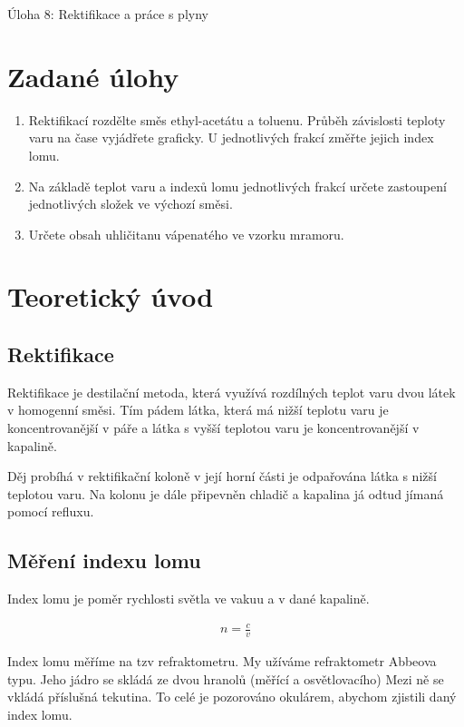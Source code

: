 \documentclass[13pt, a4paper, twoside]{article}
\begin{document}
\begin{center}
    \Huge
    Úloha 8: Rektifikace a práce s plyny
\end{center}
\large \onehalfspacing
\section*{Zadané úlohy}
\begin{enumerate}
    \item Rektifikací rozdělte směs ethyl-acetátu a toluenu. Průběh závislosti teploty varu na čase
    vyjádřete graficky. U jednotlivých frakcí změřte jejich index lomu.
    \item  Na základě teplot varu a indexů lomu jednotlivých frakcí určete zastoupení jednotlivých
    složek ve výchozí směsi.
    \item Určete obsah uhličitanu vápenatého ve vzorku mramoru.
\end{enumerate}

\section*{Teoretický úvod}
\subsection*{Rektifikace}
Rektifikace je destilační metoda, která využívá rozdílných teplot varu dvou látek v homogenní směsi. Tím pádem látka, která má nižší teplotu varu je koncentrovanější v páře a látka s vyšší teplotou varu je koncentrovanější v kapalině.


Děj probíhá v rektifikační koloně v její horní části je odpařována látka s nižší teplotou varu. Na kolonu je dále připevněn chladič a kapalina já odtud jímaná pomocí refluxu.

\subsection*{Měření indexu lomu}
Index lomu je poměr rychlosti světla ve vakuu a v dané kapalině.

\begin{align*}
    n = \frac{c}{v}
\end{align*}


Index lomu měříme na tzv refraktometru. My užíváme refraktometr Abbeova typu. Jeho jádro se skládá ze dvou hranolů (měřící a osvětlovacího) Mezi ně se vkládá příslušná tekutina. To celé je pozorováno okulárem, abychom zjistili daný index lomu.
\end{document}

